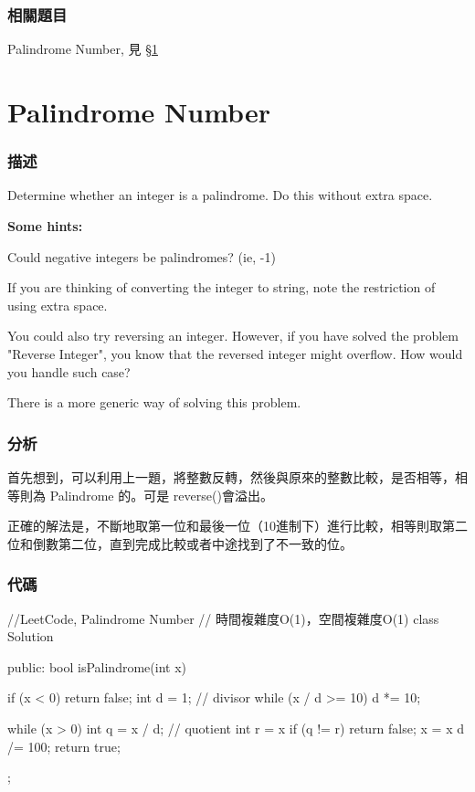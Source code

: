 \subsubsection{相關題目}
\begindot
\item Palindrome Number, 見 \S \ref{sec:palindrome-number}
\myenddot


\section{Palindrome Number} %
\label{sec:palindrome-number}


\subsubsection{描述}
Determine whether an integer is a palindrome. Do this without extra space.

\textbf{Some hints:}

Could negative integers be palindromes? (ie, -1)

If you are thinking of converting the integer to string, note the restriction of using extra space.

You could also try reversing an integer. However, if you have solved the problem "Reverse Integer", you know that the reversed integer might overflow. How would you handle such case?

There is a more generic way of solving this problem.


\subsubsection{分析}
首先想到，可以利用上一題，將整數反轉，然後與原來的整數比較，是否相等，相等則為 Palindrome 的。可是 reverse()會溢出。

正確的解法是，不斷地取第一位和最後一位（10進制下）進行比較，相等則取第二位和倒數第二位，直到完成比較或者中途找到了不一致的位。


\subsubsection{代碼}
\begin{Code}
//LeetCode, Palindrome Number
// 時間複雜度O(1)，空間複雜度O(1)
class Solution {
public:
    bool isPalindrome(int x) {
        if (x < 0) return false;
        int d = 1; // divisor
        while (x / d >= 10) d *= 10;

        while (x > 0) {
            int q = x / d;  // quotient
            int r = x %
            if (q != r) return false;
            x = x %
            d /= 100;
        }
        return true;
    }
};
\end{Code}


